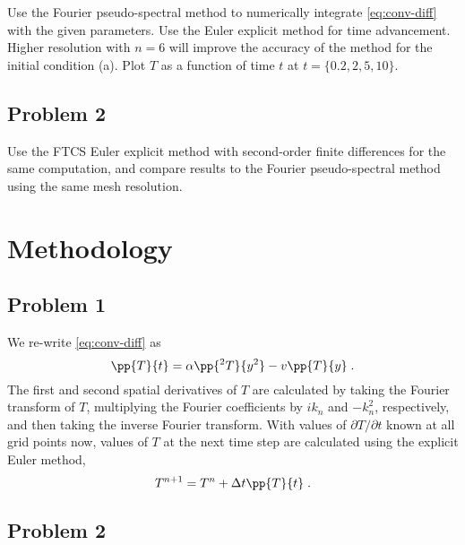 \documentclass[11pt]{article}
\begin{document}
Use the Fourier pseudo-spectral method to numerically integrate \eqref{eq:conv-diff} with the given parameters. Use the Euler explicit method for time advancement. Higher resolution with $n=6$ will improve the accuracy of the method for the initial condition (a). Plot $T$ as a function of time $t$ at $t = \{0.2, 2, 5, 10\}$.

\subsection{Problem 2}

Use the FTCS Euler explicit method with second-order finite differences for the same computation, and compare results to the Fourier pseudo-spectral method using the same mesh resolution.

\section{Methodology} %

\subsection{Problem 1}

We re-write \eqref{eq:conv-diff} as
\begin{equation}
\pp{T}{t} = \alpha \pp{^2T}{y^2} - v \pp{T}{y}
\;.
\end{equation}
The first and second spatial derivatives of $T$ are calculated by taking the Fourier transform of $T$, multiplying the Fourier coefficients by $i k_n$ and $-k_n^2$, respectively, and then taking the inverse Fourier transform. With values of $\partial T / \partial t$ known at all grid points now, values of $T$ at the next time step are calculated using the explicit Euler method,
\begin{equation}
T^{n+1} = T^n + \Delta t \pp{T}{t}
\;.
\end{equation}

\subsection{Problem 2}
\end{document}
